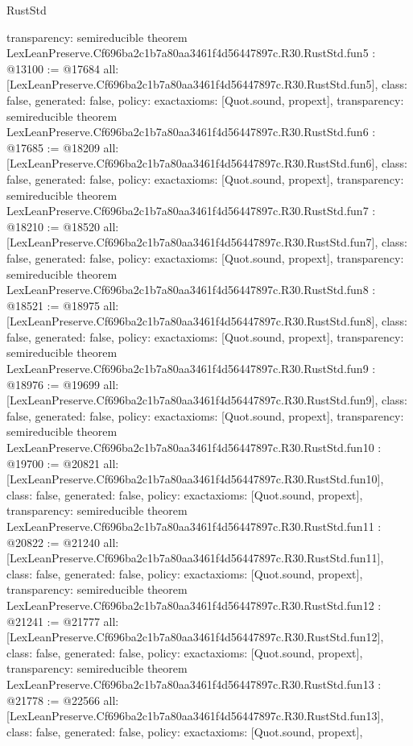 \begin{lexlean}{RustStd}
\begin{coremodule}
{  transparency: semireducible
}
theorem LexLeanPreserve.Cf696ba2c1b7a80aa3461f4d56447897c.R30.RustStd.fun5 : @13100 := @17684 {
  all: [LexLeanPreserve.Cf696ba2c1b7a80aa3461f4d56447897c.R30.RustStd.fun5],
  class: false,
  generated: false,
  policy: exact{axioms: [Quot.sound, propext]},
  transparency: semireducible
}
theorem LexLeanPreserve.Cf696ba2c1b7a80aa3461f4d56447897c.R30.RustStd.fun6 : @17685 := @18209 {
  all: [LexLeanPreserve.Cf696ba2c1b7a80aa3461f4d56447897c.R30.RustStd.fun6],
  class: false,
  generated: false,
  policy: exact{axioms: [Quot.sound, propext]},
  transparency: semireducible
}
theorem LexLeanPreserve.Cf696ba2c1b7a80aa3461f4d56447897c.R30.RustStd.fun7 : @18210 := @18520 {
  all: [LexLeanPreserve.Cf696ba2c1b7a80aa3461f4d56447897c.R30.RustStd.fun7],
  class: false,
  generated: false,
  policy: exact{axioms: [Quot.sound, propext]},
  transparency: semireducible
}
theorem LexLeanPreserve.Cf696ba2c1b7a80aa3461f4d56447897c.R30.RustStd.fun8 : @18521 := @18975 {
  all: [LexLeanPreserve.Cf696ba2c1b7a80aa3461f4d56447897c.R30.RustStd.fun8],
  class: false,
  generated: false,
  policy: exact{axioms: [Quot.sound, propext]},
  transparency: semireducible
}
theorem LexLeanPreserve.Cf696ba2c1b7a80aa3461f4d56447897c.R30.RustStd.fun9 : @18976 := @19699 {
  all: [LexLeanPreserve.Cf696ba2c1b7a80aa3461f4d56447897c.R30.RustStd.fun9],
  class: false,
  generated: false,
  policy: exact{axioms: [Quot.sound, propext]},
  transparency: semireducible
}
theorem LexLeanPreserve.Cf696ba2c1b7a80aa3461f4d56447897c.R30.RustStd.fun10 : @19700 := @20821 {
  all: [LexLeanPreserve.Cf696ba2c1b7a80aa3461f4d56447897c.R30.RustStd.fun10],
  class: false,
  generated: false,
  policy: exact{axioms: [Quot.sound, propext]},
  transparency: semireducible
}
theorem LexLeanPreserve.Cf696ba2c1b7a80aa3461f4d56447897c.R30.RustStd.fun11 : @20822 := @21240 {
  all: [LexLeanPreserve.Cf696ba2c1b7a80aa3461f4d56447897c.R30.RustStd.fun11],
  class: false,
  generated: false,
  policy: exact{axioms: [Quot.sound, propext]},
  transparency: semireducible
}
theorem LexLeanPreserve.Cf696ba2c1b7a80aa3461f4d56447897c.R30.RustStd.fun12 : @21241 := @21777 {
  all: [LexLeanPreserve.Cf696ba2c1b7a80aa3461f4d56447897c.R30.RustStd.fun12],
  class: false,
  generated: false,
  policy: exact{axioms: [Quot.sound, propext]},
  transparency: semireducible
}
theorem LexLeanPreserve.Cf696ba2c1b7a80aa3461f4d56447897c.R30.RustStd.fun13 : @21778 := @22566 {
  all: [LexLeanPreserve.Cf696ba2c1b7a80aa3461f4d56447897c.R30.RustStd.fun13],
  class: false,
  generated: false,
  policy: exact{axioms: [Quot.sound, propext]},
}
\end{coremodule}
\end{lexlean}
